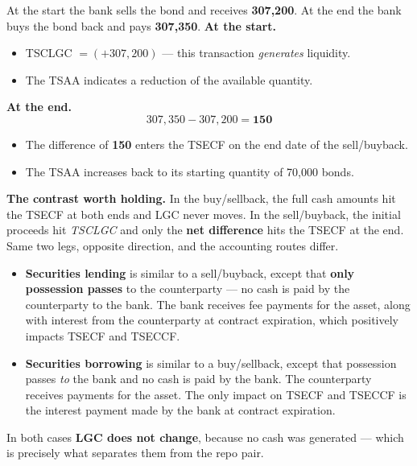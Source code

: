 \begin{lrexbox}
At the start the bank sells the bond and receives \textbf{307,200}. At the end the bank buys the bond back and pays \textbf{307,350}.
\tcblower
\textbf{At the start.}
\begin{itemize}
\item TSCLGC $= (+307{,}200)$ --- this transaction \emph{generates} liquidity.
\item The TSAA indicates a reduction of the available quantity.
\end{itemize}
\textbf{At the end.}
\[ 307{,}350 - 307{,}200 = \mathbf{150} \]
\begin{itemize}
\item The difference of \textbf{150} enters the TSECF on the end date of the sell/buyback.
\item The TSAA increases back to its starting quantity of 70,000 bonds.
\end{itemize}
\textbf{The contrast worth holding.} In the buy/sellback, the full cash amounts hit the TSECF at both ends and LGC never moves. In the sell/buyback, the initial proceeds hit \emph{TSCLGC} and only the \textbf{net difference} hits the TSECF at the end. Same two legs, opposite direction, and the accounting routes differ.
\end{lrexbox}

\begin{lrkeybox}
\begin{itemize}
\item \textbf{Securities lending} is similar to a sell/buyback, except that \textbf{only possession passes} to the counterparty --- no cash is paid by the counterparty to the bank. The bank receives fee payments for the asset, along with interest from the counterparty at contract expiration, which positively impacts TSECF and TSECCF.
\item \textbf{Securities borrowing} is similar to a buy/sellback, except that possession passes \emph{to} the bank and no cash is paid by the bank. The counterparty receives payments for the asset. The only impact on TSECF and TSECCF is the interest payment made by the bank at contract expiration.
\end{itemize}
In both cases \textbf{LGC does not change}, because no cash was generated --- which is precisely what separates them from the repo pair.
\end{lrkeybox}

